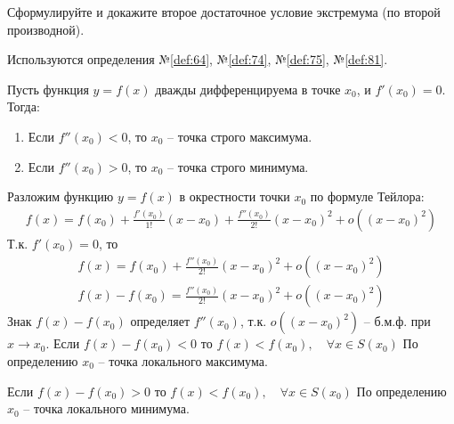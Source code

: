 \begin{question}
    Сформулируйте и докажите второе достаточное условие экстремума (по второй производной).
\end{question}
\begin{used}
    Используются определения №\ref{def:64}, №\ref{def:74}, №\ref{def:75}, №\ref{def:81}.
\end{used}
\begin{theorem}
    Пусть функция $y = f(x)$ дважды дифференцируема в точке $x_0$, и $f'(x_0) = 0$. Тогда:
    \begin{enumerate}
        \item Если $f''(x_0) < 0$, то $x_0$ -- точка строго максимума. 
        \item Если $f''(x_0) > 0$, то $x_0$ -- точка строго минимума. 
    \end{enumerate}
\end{theorem}
\begin{sufficiency}
    Разложим функцию $y = f(x)$ в окрестности точки $x_0$ по формуле Тейлора:
    \begin{gather*}
        f(x) = f(x_0) + \frac{f'(x_0)}{1!} (x - x_0) + \frac{f''(x_0)}{2!} (x - x_0)^2 + o((x - x_0)^{2})
    \end{gather*}
    Т.к. $f'(x_0) = 0$, то
    \begin{align*}
        f(x) = f(x_0) + \frac{f''(x_0)}{2!}(x - x_0)^2 + o((x - x_0)^2) \\
        f(x) - f(x_0) = \frac{f''(x_0)}{2!}(x - x_0)^2 + o((x - x_0)^2)
    \end{align*}
    Знак $f(x) - f(x_0)$ определяет $f''(x_0)$, т.к. $o((x - x_0)^2)$ -- б.м.ф. при $x \to  x_0$. 
    Если $f(x) - f(x_0) < 0$ то $f(x) < f(x_0), \quad \forall x \in  S(x_0)$
    По определению $x_0$ -- точка локального максимума.

    Если $f(x) - f(x_0) > 0$ то $f(x) < f(x_0), \quad \forall x \in  S(x_0)$
    По определению $x_0$ -- точка локального минимума.
\end{sufficiency}
\pagebreak



